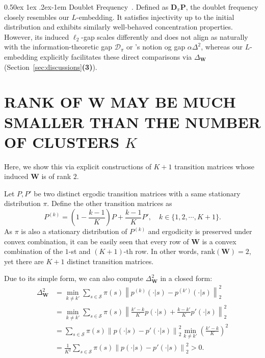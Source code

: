 \documentclass[twoside]{article}
\makeatletter
\renewcommand{\paragraph}{%
  \@startsection{paragraph}{4}%
  {\z@}{0.50ex \@plus 1ex \@minus .2ex}{-1em}%
  {\normalfont\normalsize\bfseries}%
}
\def\mD{{\bm{D}}}
\def\mP{{\bm{P}}}
\def\mW{{\bm{W}}}
\def\gD{{\mathcal{D}}}
\def\gS{{\mathcal{S}}}
\theoremstyle{plain}
\newcommand{\rank}{\mathrm{rank}}
\makeatother
\begin{document}
\paragraph{Doublet Frequency~\citep{vidyasagar2014markov,wolfer2021markov}.}
Defined as $\mD_\pi \mP$, the doublet frequency closely resembles our $L$-embedding.
It satisfies injectivity up to the initial distribution and exhibits similarly well-behaved concentration properties.
However, its induced $\ell_2$-gap scales differently and does not align as naturally with the information-theoretic gap $\gD_\pi$ or \citet{kausik2023mixture}'s notion og gap $\alpha \Delta^2$, whereas our $L$-embedding explicitly facilitates these direct comparisons via $\Delta_\mW$ (Section~\ref{sec:discussions}\textbf{(3)}).

\newpage
\section{\texorpdfstring{RANK OF $\mW$ MAY BE MUCH SMALLER THAN THE NUMBER OF CLUSTERS $K$}{RANK OF W MAY BE MUCH SMALLER THAN THE NUMBER OF CLUSTERS K}}
\label{app:rank-K}
Here, we show this via explicit constructions of $K + 1$ transition matrices whose induced $\mW$ is of rank $2$.

Let $P, P'$ be two distinct ergodic transition matrices with a same stationary distribution $\pi$.
Define the other transition matrices as
\begin{equation}
    P^{(k)} = \left(1 - \frac{k - 1}{K} \right) P + \frac{k - 1}{K} P', \quad k \in \{1, 2, \cdots, K+1\}.
\end{equation}
As $\pi$ is also a stationary distribution of $P^{(k)}$ and ergodicity is preserved under convex combination, it can be easily seen that every row of $\mW$ is a convex combination of the $1$-st and $(K+1)$-th row.
In other words, $\rank(\mW) = 2$, yet there are $K + 1$ distinct transition matrices.

Due to its simple form, we can also compute $\Delta_\mW^2$ in a closed form:
\begin{align*}
    \Delta_\mW^2 &= \min_{k \neq k'} \sum_{s \in \gS} \pi(s) \left\lVert p^{(k)}(\cdot | s) - p^{(k')}(\cdot | s) \right\rVert_2^2 \\
    &= \min_{k \neq k'} \sum_{s \in \gS} \pi(s) \left\lVert \frac{k' - k}{K} p(\cdot | s) + \frac{k - k'}{K} p'(\cdot | s) \right\rVert_2^2 \\
    &= \sum_{s \in \gS} \pi(s) \left\lVert p(\cdot | s) - p'(\cdot | s) \right\rVert_2^2 \min_{k \neq k'}  \left( \frac{k' - k}{K}\right)^2 \\
    &= \frac{1}{K^2} \sum_{s \in \gS} \pi(s) \left\lVert p(\cdot | s) - p'(\cdot | s) \right\rVert_2^2 > 0.
\end{align*}
\end{document}
